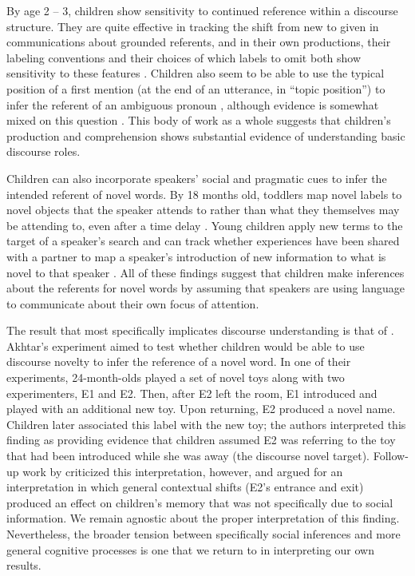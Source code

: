 \documentclass[man]{apa2}
\begin{document}
By age 2 -- 3, children show sensitivity to continued reference within a discourse structure.  They are quite effective in tracking the shift from new to given in communications about grounded referents, and in their own productions, their labeling conventions and their choices of which labels to omit both show sensitivity to these features \cite{allen2000, bates1976, greenfield1976, clancy2004, skarabela2007}.  Children also seem to be able to use the typical position of a first mention (at the end of an utterance, in ``topic position'') to infer the referent of an ambiguous pronoun \cite{song2005, song2007, pyykkonen2010}, although evidence is somewhat mixed on this question \cite{arnold2007}. This body of work as a whole suggests that children's production and comprehension shows substantial evidence of understanding basic discourse roles.

Children can also incorporate speakers' social and pragmatic cues to infer the intended referent of novel words. By 18 months old, toddlers map novel labels to novel objects that the speaker attends to rather than what they themselves may be attending to, even after a time delay \cite{baldwin1991,baldwin1993}.  Young children apply new terms to the target of a speaker's search \cite{tomasello1994} and can track whether experiences have been shared with a partner to map a speaker's introduction of new information to what is novel to that speaker \cite{akhtar1996}. All of these findings suggest that children make inferences about the referents for novel words by assuming that speakers are using language to communicate about their own focus of attention. 

The result that most specifically implicates discourse understanding is that of . Akhtar's experiment aimed to test whether children would be able to use discourse novelty to infer the reference of a novel word. In one of their experiments, 24-month-olds played a set of novel toys along with two experimenters, E1 and E2. Then, after E2 left the room, E1 introduced and played with an additional new toy. Upon returning, E2 produced a novel name. Children later associated this label with the new toy; the authors interpreted this finding as providing evidence that children assumed E2 was referring to the toy that had been introduced while she was away (the discourse novel target). Follow-up work by  criticized this interpretation, however, and argued for an interpretation in which general contextual shifts (E2's entrance and exit) produced an effect on children's memory that was not specifically due to social information. We remain agnostic about the proper interpretation of this finding. Nevertheless, the broader tension between specifically social inferences and more general cognitive processes is one that we return to in interpreting our own results.
\end{document}
